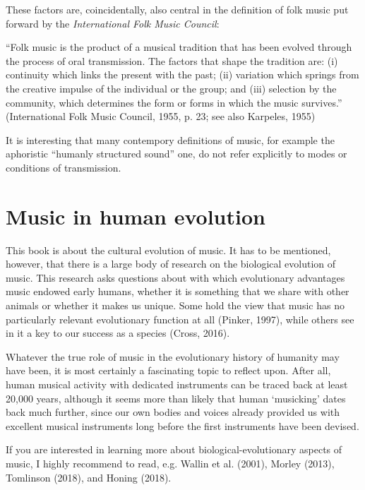 \documentclass[
  a4paperpaper,
  ,captions=tableheading
]{scrbook}
\renewenvironment{quote}{\begin{customblockquote}\list{}{\rightmargin=0em\leftmargin=0em}%
\item\relax\color{blockquote-text}\ignorespaces}{\unskip\unskip\endlist\end{customblockquote}}
\begin{document}
These factors are, coincidentally, also central in the definition of
folk music put forward by the \emph{International Folk Music Council}:

\begin{quote}
``Folk music is the product of a musical tradition that has been evolved
through the process of oral transmission. The factors that shape the
tradition are: (i) continuity which links the present with the past;
(ii) variation which springs from the creative impulse of the individual
or the group; and (iii) selection by the community, which determines the
form or forms in which the music survives.'' (International Folk Music
Council, 1955, p. 23; see also Karpeles, 1955)
\end{quote}

It is interesting that many contempory definitions of music, for example
the aphoristic ``humanly structured sound'' one, do not refer explicitly
to modes or conditions of transmission.

\hypertarget{music-in-human-evolution}{%
\section{Music in human evolution}\label{music-in-human-evolution}}

This book is about the cultural evolution of music. It has to be
mentioned, however, that there is a large body of research on the
biological evolution of music. This research asks questions about with
which evolutionary advantages music endowed early humans, whether it is
something that we share with other animals or whether it makes us
unique. Some hold the view that music has no particularly relevant
evolutionary function at all (Pinker, 1997), while others see in it a
key to our success as a species (Cross, 2016).

Whatever the true role of music in the evolutionary history of humanity
may have been, it is most certainly a fascinating topic to reflect upon.
After all, human musical activity with dedicated instruments can be
traced back at least 20,000 years, although it seems more than likely
that human `musicking' dates back much further, since our own bodies and
voices already provided us with excellent musical instruments long
before the first instruments have been devised.

If you are interested in learning more about biological-evolutionary
aspects of music, I highly recommend to read, e.g. Wallin et al. (2001),
Morley (2013), Tomlinson (2018), and Honing (2018).
\end{document}
